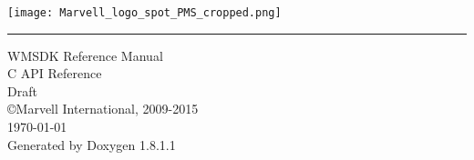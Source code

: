 \documentclass{book}
\newcommand{\TitleHRule}{\rule{\linewidth}{10pt}}
\begin{document}
\SetWatermarkFontSize{3cm}
\hypersetup{pageanchor=false,citecolor=blue}
\begin{titlepage}
\begin{minipage}[t]{\textwidth}
\raggedleft
\texttt{[image: Marvell\_logo\_spot\_PMS\_cropped.png]}
\end{minipage}
\vspace{.5cm}
\TitleHRule
\vspace{3.5cm}
\begin{flushleft}
{\Huge {\color{red} WMSDK Reference Manual}}\\
\vspace{1cm}
{\Large { C API Reference }}\\
\vspace{.75cm}
{{ Draft }}\\
\vspace{4cm}
{\Large \copyright \space Marvell International, 2009-2015}\\
\vspace{1cm}
{\small {\today \space \currenttime}}\\
{\small Generated by Doxygen 1.8.1.1}\\
\end{flushleft}
\end{titlepage}
\clearemptydoublepage
{}
\tableofcontents
\clearemptydoublepage
{}
\hypersetup{pageanchor=true,citecolor=blue}
\end{document}
